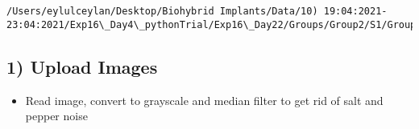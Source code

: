\documentclass[11pt]{article}
\providecommand{\tightlist}{%
      \setlength{\itemsep}{0pt}\setlength{\parskip}{0pt}}
\begin{document}
    \begin{Verbatim}[commandchars=\\\{\}]
/Users/eylulceylan/Desktop/Biohybrid Implants/Data/10) 19:04:2021-23:04:2021/Exp16\_Day4\_pythonTrial/Exp16\_Day22/Groups/Group2/S1/Group2\_S1\_red.tif

    \end{Verbatim}

    \hypertarget{upload-images}{%
\subsection{1) Upload Images}\label{upload-images}}

\begin{itemize}
\tightlist
\item
  Read image, convert to grayscale and median filter to get rid of salt
  and pepper noise
\end{itemize}
\end{document}
